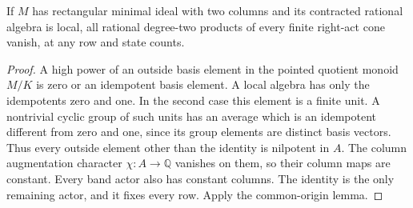 \begin{corollary}
\label{CP2:A-local-two-column-acts}
If $M$ has rectangular minimal ideal with two columns
and its contracted rational algebra is local, all
rational degree-two products of every finite right-act
cone vanish, at any row and state counts.
\end{corollary}
\begin{proof}
A high power of an outside basis element in the pointed
quotient monoid $M/K$ is zero or an idempotent basis
element. A local algebra has only the idempotents zero
and one. In the second case this element is a finite
unit. A nontrivial cyclic group of such units has an
average which is an idempotent different from zero and
one, since its group elements are distinct basis vectors.
Thus every outside element other than the identity is
nilpotent in $A$. The column augmentation character
$\chi:A\to\mathbb Q$ vanishes on them, so their column
maps are constant. Every band actor also has constant
columns. The identity is the only remaining actor, and
it fixes every row. Apply the common-origin lemma.
\end{proof}

